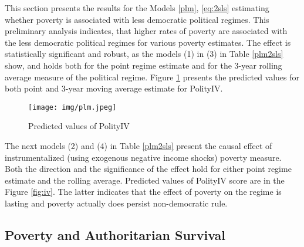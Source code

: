 \documentclass[a4paper, 12pt]{article}
\begin{document}
	
	
	\noindent This section presents the results for the Models \eqref{plm}, \eqref{eq:2sls} estimating whether poverty is associated with less democratic political regimes. This preliminary analysis indicates, that higher rates of poverty are associated with the less democratic political regimes for various poverty estimates. The effect is statistically significant and robust, as the models (1) in (3) in Table \ref{plm2sls} show, and holds both for the point regime estimate and for the 3-year rolling average measure of the political regime. Figure \ref{fig:plm} presents the predicted values for both point and 3-year moving average estimate for PolityIV.
	\\
	
		\begin{figure}[!ht]
	    \centering
	    \texttt{[image: img/plm.jpeg]}
	    \caption{Predicted values of PolityIV}
	    \label{fig:plm}
	\end{figure}

	
	\noindent The next models (2) and (4) in Table \ref{plm2sls} present the causal effect of instrumentalized (using exogenous negative income shocks) poverty measure. Both the direction and the significance of the effect hold for either point regime estimate and the rolling average. Predicted values of PolityIV score are in the Figure \ref{fig:iv}. The latter indicates that the effect of poverty on the regime is lasting and poverty actually does persist non-democratic rule.
	

	
	
	\subsection{Poverty and Authoritarian Survival}
	
\end{document}
